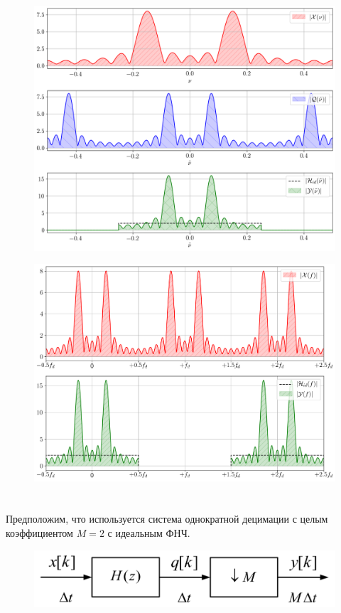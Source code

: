 \begin{figure}[!h]
	\centering
	\includegraphics[width=0.85\columnwidth]{pics/spring/8/8-2-2.png}
	\label{fig:8-2-2}
\end{figure}

\begin{figure}[!h]
	\centering
	\includegraphics[width=0.85\columnwidth]{pics/spring/8/8-2-3.png}
	\label{fig:8-2-3}
\end{figure}

\newpage
\section{}
Предположим, что используется система однократной децимации с целым коэффициентом $M=2$ с идеальным ФНЧ.

\begin{figure}[!h]
	\centering
	\includegraphics[width=0.8\columnwidth]{pics/spring/8/830.png}
	\label{fig:8-3-0}
\end{figure}


